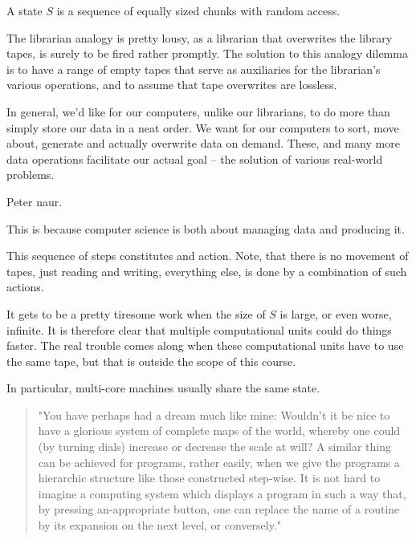 \begin{definition}

A state $S$ is a sequence of equally sized chunks with random access.

\end{definition}

The librarian analogy is pretty lousy, as a librarian that overwrites the
library tapes, is surely to be fired rather promptly. The solution to this
analogy dilemma is to have a range of empty tapes that serve as auxiliaries for
the librarian's various operations, and to assume that tape overwrites are
lossless. 


In general, we'd like for our computers, unlike our librarians, to do more than
simply store our data in a neat order. We want for our computers to sort, move
about, generate and actually overwrite data on demand. These, and many more
data operations facilitate our actual goal -- the solution of various
real-world problems.

Peter naur.

This is because computer science is both about
managing data and producing it. 

This sequence of steps constitutes and action. Note, that there is no movement
of tapes, just reading and writing, everything else, is done by a combination
of such actions.


It gets to be a pretty tiresome work when the size of
$S$ is large, or even worse, infinite. It is therefore clear that multiple computational
units could do things faster. The real trouble comes along when these
computational units have to use the same tape, but that is outside the scope of
this course.

In particular, multi-core machines usually share the same state.




\begin{quote}"You have perhaps had a dream much like mine: Wouldn't it be nice
to have a glorious system of complete maps of the world, whereby one could (by
turning dials) increase or decrease the scale at will? A similar thing can be
achieved for programs, rather easily, when we give the programs a hierarchic
structure like those constructed step-wise. It is not hard to imagine a
computing system which displays a program in such a way that, by pressing
an-appropriate button, one can replace the name of a routine by its expansion
on the next level, or conversely."\cite{knuth-review-of-sp}\end{quote}

